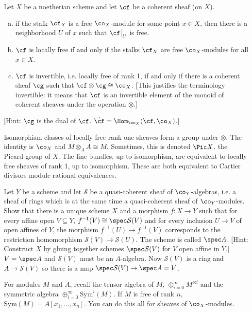 \begin{exc}
Let $X$ be a noetherian scheme and let $\cf$ be a coherent sheaf (on $X$).
	\begin{enumerate}[(a)]
	\item if the stalk $\cf_X$ is a free $\co_X$-module for some point $x \in X$, then there is a neighborhood $U$ of $x$ such that $\cf\big|_U$ is free.
	\item $\cf$ is locally free if and only if the stalks $\cf_X$ are free $\co_X$-modules for all $x \in X$.
	\item $\cf$ is invertible, i.e. locally free of rank 1, if and only if there is a coherent sheaf $\cg$ such that $\cf \otimes \cg \cong \co_X$. [This justifies the terminology invertible: it means that $\cf$ is an invertible element of the monoid of coherent sheaves under the operation $\otimes$.]
	\end{enumerate}
[Hint: $\cg$ is the dual of $\cf$. $\tilde{\cf} = \Hom_{\co_X}(\cf,\co_X)$.]
\end{exc}


Isomorphism classes of locally free rank one sheaves form a group under $\otimes$. The identity is $\co_X$ and $M \otimes_A A \cong M$. Sometimes, this is denoted $\Pic X$, the Picard group of $X$. The line bundles, up to isomorphism, are equivalent to locally free sheaves of rank 1, up to isomorphism. These are both equivalent to Cartier divisors module rational equivalences. 


\begin{exc}
Let $Y$ be a scheme and let $\mathcal{S}$ be a quasi-coherent sheaf of $\co_Y$-algebras, i.e. a sheaf of rings which is at the same time a quasi-coherent sheaf of $\co_Y$-modules. Show that there is a unique scheme $X$ and a morphism $f: X \to Y$ such that for every affine open $V \subseteq Y$, $f^{-1}(V) \cong \spec \mathcal{S}(V)$ and for every inclusion $U \to V$ of open affines of $Y$, the morphism $f^{-1}(U) \to f^{-1}(V)$ corresponds to the restriction homomorphism $\mathcal{S}(V) \to \mathcal{S}(U)$. The scheme is called $\spec A$. [Hint: Construct $X$ by gluing together schemes $\spec \mathcal{S}(V)$ for $V$ open affine in $Y$.] $V=\spec A$ and $\mathcal{S}(V)$ must be an $A$-algebra. Now $\mathcal{S}(V)$ is a ring and $A \to \mathcal{S}(V)$ so there is a map $\spec \mathcal{S}(V) \to \spec A=V$.
\end{exc}


For modules $M$ and $A$, recall the tensor algebra of $M$, $\oplus_{i=0}^\infty M^{\otimes i}$ and the symmetric algebra $\oplus_{i=0}^\infty \text{Sym}^i(M)$. If $M$ is free of rank $n$, $\text{Sym}(M)=A[x_1,\ldots,x_n]$. You can do this all for sheaves of $\co_X$-modules. 


